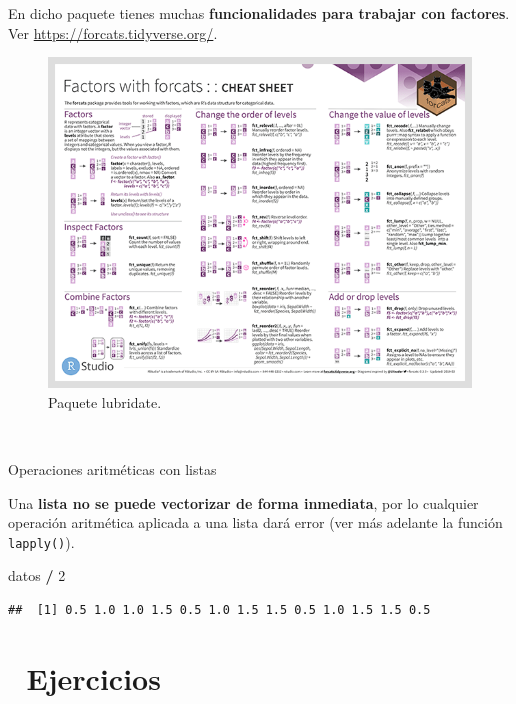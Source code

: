 \documentclass[11pt,]{book}
\newenvironment{Shaded}{\begin{snugshade}}{\end{snugshade}}
\newcommand{\DecValTok}[1]{\textcolor[rgb]{0.06,0.06,0.06}{#1}}
\newcommand{\NormalTok}[1]{#1}
\newcommand{\OperatorTok}[1]{\textcolor[rgb]{0.43,0.43,0.43}{\textbf{#1}}}
\newcommand{\StringTok}[1]{\textcolor[rgb]{0.5,0.5,0.5}{#1}}
\begin{document}
En dicho paquete tienes muchas \textbf{funcionalidades para trabajar con factores}. Ver \url{https://forcats.tidyverse.org/}.

\begin{figure}

{\centering \includegraphics[width=0.95\linewidth]{./img/forcats} 

}

\caption{Paquete lubridate.}\label{fig:forcats}
\end{figure}

~

Operaciones aritméticas con listas

Una \textbf{lista no se puede vectorizar de forma inmediata}, por lo cualquier operación aritmética aplicada a una lista dará error (ver más adelante la función \texttt{lapply()}).

\begin{Shaded}
\begin{Highlighting}[]
\NormalTok{datos }\OperatorTok{/}\StringTok{ }\DecValTok{2}
\end{Highlighting}
\end{Shaded}

\begin{verbatim}
##  [1] 0.5 1.0 1.0 1.5 0.5 1.0 1.5 1.5 0.5 1.0 1.5 1.5 0.5
\end{verbatim}

\hypertarget{ejercicios-3}{%
\section{📝 Ejercicios}\label{ejercicios-3}}
\end{document}
